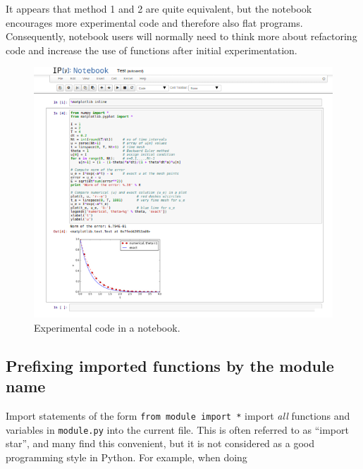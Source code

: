 \documentclass[%
oneside,                 %
final,                   %
10pt]{article}
\begin{document}
\noindent
It appears that method 1 and 2 are quite equivalent, but the notebook
encourages more experimental code and therefore also flat programs.
Consequently, notebook users will normally need to think more about
refactoring code and increase the use of functions after initial
experimentation.


\begin{figure}[!ht]  %
  \centerline{\includegraphics[width=0.8\linewidth]{fig-softeng/ipynb_flat.png}}
  \caption{
  Experimental code in a notebook. \label{softeng1:ipynb}
  }
\end{figure}



\subsection{Prefixing imported functions by the module name}
\label{softeng1:basic:modprefix}


Import statements of the form \texttt{from module import *} import
\emph{all} functions and variables in \texttt{module.py} into the current file.
This is often referred to as ``import star'', and
many find this convenient, but it is not considered as a good
programming style in Python.
For example, when doing
\end{document}
